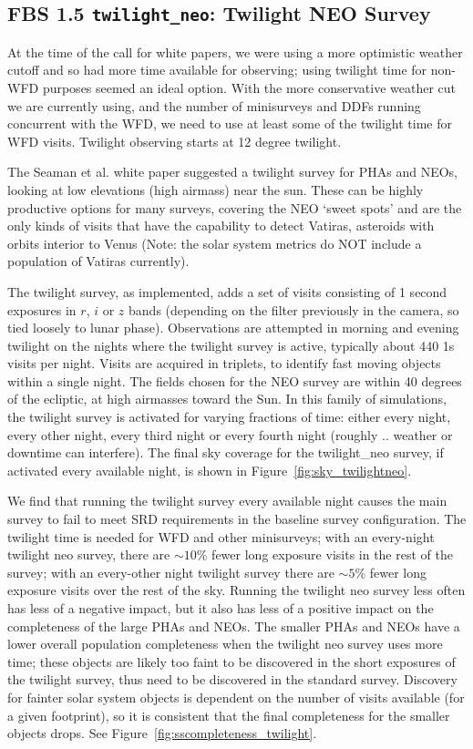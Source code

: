 \subsection{FBS 1.5 {\tt twilight\_neo}: Twilight NEO Survey}\label{ss:twilightneo}

At the time of the call for white papers, we were using a more optimistic weather cutoff and so had more time available for observing; using twilight time for non-WFD purposes seemed an ideal option. With the more conservative weather cut we are currently using, and the number of minisurveys and DDFs running concurrent with the WFD, we need to use at least some of the twilight time for WFD visits. Twilight observing starts at 12 degree twilight. 

The Seaman et al. white paper suggested a twilight survey for PHAs and NEOs, looking at low elevations (high airmass) near the sun. These can be highly productive options for many surveys, covering the NEO `sweet spots' and are the only kinds of visits that have the capability to detect Vatiras, asteroids with orbits interior to Venus (Note: the solar system metrics do NOT include a population of Vatiras currently). 

The twilight survey, as implemented, adds a set of visits consisting of 1 second exposures in $r$, $i$ or $z$ bands (depending on the filter previously in the camera, so tied loosely to lunar phase). Observations are attempted in morning and evening twilight on the nights where the twilight survey is active, typically about 440 1s visits per night. Visits are acquired in triplets, to identify fast moving objects within a single night. The fields chosen for the NEO survey are within 40 degrees of the ecliptic, at high airmasses toward the Sun. In this family of simulations, the twilight survey is activated for varying fractions of time: either every night, every other night, every third night or every fourth night (roughly .. weather or downtime can interfere). The final sky coverage for the twilight\_neo survey, if activated every available night, is shown in Figure~\ref{fig:sky_twilightneo}. 

We find that running the twilight survey every available night causes the main survey to fail to meet SRD requirements in the baseline survey configuration. The twilight time is needed for WFD and other minisurveys; with an every-night twilight neo survey, there are $\sim10$\% fewer long exposure visits in the rest of the survey; with an every-other night twilight survey there are $\sim5$\% fewer long exposure visits over the rest of the sky. Running the twilight neo survey less often has less of a negative impact, but it also has less of a positive impact on the completeness of the large PHAs and NEOs. The smaller PHAs and NEOs have a lower overall population completeness when the twilight neo survey uses more time; these objects are likely too faint to be discovered in the short exposures of the twilight survey, thus need to be discovered in the standard survey. Discovery for fainter solar system objects is dependent on the number of visits available (for a given footprint), so it is consistent that the final completeness for the smaller objects drops. See Figure~\ref{fig:sscompleteness_twilight}. 


